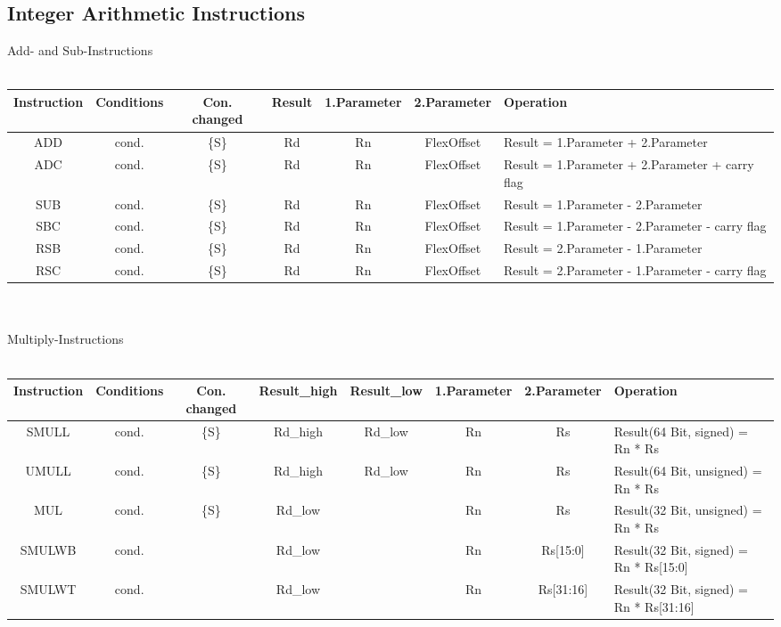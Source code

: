 {\begin{landscape}
\section{Integer Arithmetic Instructions}
{\rot Add- and Sub-Instructions}\\
\\
\begin{tabular}{|c|c|c|c|c|c|l|}
\hline
Instruction & Conditions & Con. changed & Result & 1.Parameter & 2.Parameter & Operation\\
\hline
ADD & cond. & \{S\} & Rd & Rn & FlexOffset & Result = 1.Parameter + 2.Parameter\\
\hline
ADC & cond. & \{S\} & Rd & Rn & FlexOffset & Result = 1.Parameter + 2.Parameter + carry flag\\
\hline
SUB & cond. & \{S\} & Rd & Rn & FlexOffset & Result = 1.Parameter - 2.Parameter\\
\hline
SBC & cond. & \{S\} & Rd & Rn & FlexOffset & Result = 1.Parameter - 2.Parameter - carry flag\\
\hline
RSB & cond. & \{S\} & Rd & Rn & FlexOffset & Result = 2.Parameter - 1.Parameter\\
\hline
RSC & cond. & \{S\} & Rd & Rn & FlexOffset & Result = 2.Parameter - 1.Parameter - carry flag\\
\hline
\end{tabular}\\
\\
{\rot Multiply-Instructions}\\
\\
\begin{tabular}{|c|c|c|c|c|c|c|l|}
\hline
Instruction & Conditions & Con. changed & Result\_high & Result\_low & 1.Parameter & 2.Parameter & Operation\\
\hline
SMULL & cond. & \{S\} & Rd\_high & Rd\_low & Rn & Rs & Result(64 Bit, signed) = Rn * Rs \\
\hline
UMULL & cond. & \{S\} & Rd\_high & Rd\_low & Rn & Rs & Result(64 Bit, unsigned) = Rn * Rs \\
\hline
MUL & cond. & \{S\} & Rd\_low &  & Rn & Rs & Result(32 Bit, unsigned) = Rn * Rs \\
\hline
\hline
SMULWB & cond. &  & Rd\_low &  & Rn & Rs[15:0] & Result(32 Bit, signed) = Rn * Rs[15:0] \\
\hline
SMULWT & cond. &  & Rd\_low &  & Rn & Rs[31:16] & Result(32 Bit, signed) = Rn * Rs[31:16] \\

\end{tabular}
\end{landscape}}
